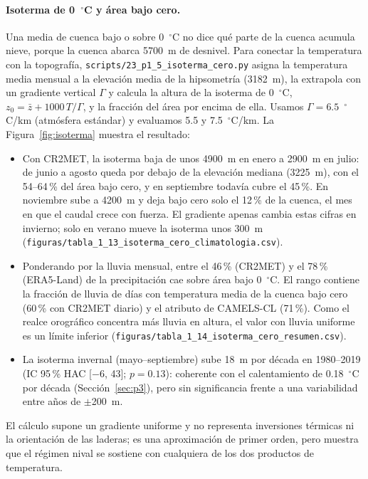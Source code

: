 \documentclass[11pt,a4paper]{article}
\newcommand{\archivo}[1]{\nolinkurl{#1}}
\begin{document}
\paragraph{Isoterma de 0~$^\circ$C y área bajo cero.}
\label{sec:isoterma}
Una media de cuenca bajo o sobre 0~$^\circ$C no dice qué parte de la cuenca acumula nieve, porque la cuenca abarca 5700~m de desnivel. Para conectar la temperatura con la topografía, \archivo{scripts/23_p1_5_isoterma_cero.py} asigna la temperatura media mensual a la elevación media de la hipsometría (3182~m), la extrapola con un gradiente vertical $\Gamma$ y calcula la altura de la isoterma de 0~$^\circ$C, $z_0=\bar z+1000\,T/\Gamma$, y la fracción del área por encima de ella. Usamos $\Gamma=6.5$~$^\circ$C/km (atmósfera estándar) y evaluamos 5.5 y 7.5~$^\circ$C/km. La Figura~\ref{fig:isoterma} muestra el resultado:
\begin{itemize}
\item Con CR2MET, la isoterma baja de unos 4900~m en enero a 2900~m en julio: de junio a agosto queda por debajo de la elevación mediana (3225~m), con el 54--64\,\% del área bajo cero, y en septiembre todavía cubre el 45\,\%. En noviembre sube a 4200~m y deja bajo cero solo el 12\,\% de la cuenca, el mes en que el caudal crece con fuerza. El gradiente apenas cambia estas cifras en invierno; solo en verano mueve la isoterma unos 300~m (\archivo{figuras/tabla_1_13_isoterma_cero_climatologia.csv}).
\item Ponderando por la lluvia mensual, entre el 46\,\% (CR2MET) y el 78\,\% (ERA5-Land) de la precipitación cae sobre área bajo 0~$^\circ$C. El rango contiene la fracción de lluvia de días con temperatura media de la cuenca bajo cero (60\,\% con CR2MET diario) y el atributo de CAMELS-CL (71\,\%). Como el realce orográfico concentra más lluvia en altura, el valor con lluvia uniforme es un límite inferior (\archivo{figuras/tabla_1_14_isoterma_cero_resumen.csv}).
\item La isoterma invernal (mayo--septiembre) sube 18~m por década en 1980--2019 (IC 95\,\% HAC [$-6$, 43]; $p=0.13$): coherente con el calentamiento de 0.18~$^\circ$C por década (Sección~\ref{sec:p3}), pero sin significancia frente a una variabilidad entre años de $\pm$200~m.
\end{itemize}
El cálculo supone un gradiente uniforme y no representa inversiones térmicas ni la orientación de las laderas; es una aproximación de primer orden, pero muestra que el régimen nival se sostiene con cualquiera de los dos productos de temperatura.
\end{document}
